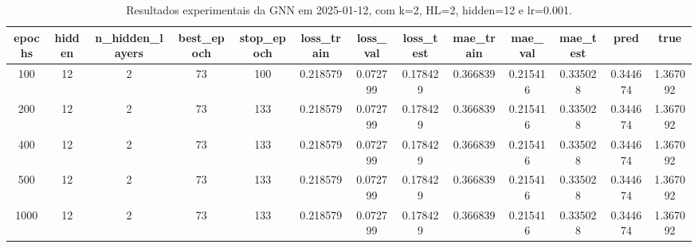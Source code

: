 \begin{table}[h]
\centering
\caption{Resultados experimentais da GNN em 2025-01-12, com k=2, HL=2, hidden=12 e lr=0.001.}
\label{tab:gnn_results_k2_hl2_h12_d20250112}
\begin{tabular}{ccccccccccccc}
\toprule
epochs & hidden & n\_hidden\_layers & best\_epoch & stop\_epoch & loss\_train & loss\_val & loss\_test & mae\_train & mae\_val & mae\_test & pred & true \\
\midrule
100 & 12 & 2 & 73 & 100 & 0.218579 & 0.072799 & 0.178429 & 0.366839 & 0.215416 & 0.335028 & 0.344674 & 1.367092 \\
200 & 12 & 2 & 73 & 133 & 0.218579 & 0.072799 & 0.178429 & 0.366839 & 0.215416 & 0.335028 & 0.344674 & 1.367092 \\
400 & 12 & 2 & 73 & 133 & 0.218579 & 0.072799 & 0.178429 & 0.366839 & 0.215416 & 0.335028 & 0.344674 & 1.367092 \\
500 & 12 & 2 & 73 & 133 & 0.218579 & 0.072799 & 0.178429 & 0.366839 & 0.215416 & 0.335028 & 0.344674 & 1.367092 \\
1000 & 12 & 2 & 73 & 133 & 0.218579 & 0.072799 & 0.178429 & 0.366839 & 0.215416 & 0.335028 & 0.344674 & 1.367092 \\
\bottomrule
\end{tabular}
\end{table}
